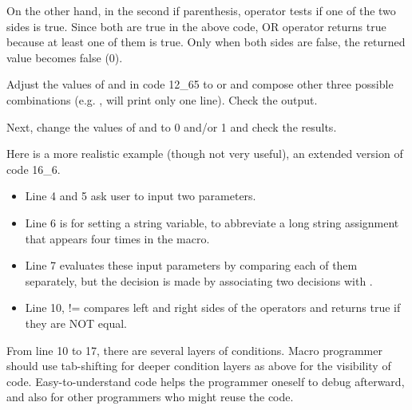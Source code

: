 On the other hand, in the second if parenthesis,
\ilcom{||} operator tests if one of the two sides is true. Since both are
true in the above code, OR operator returns true because at least one of them is
true. Only when both sides are false, the returned value becomes false (0).

\begin{indentexercise}{1}
Adjust the values of  and  in code 12\_65 to  or  and
compose other three possible combinations (e.g. ,  will print
only one line). Check the output.

Next, change the values of  and  to 0 and/or
1 and check the results. 
\end{indentexercise}

Here is a more realistic example (though not very useful), an extended version
of code 16\_6.

\begin{itemize}
\item Line 4 and 5 ask user to input two parameters.
\item Line 6 is for setting a string variable, to abbreviate a long string assignment that appears four times in the macro.
\item Line 7 evaluates these input parameters by comparing each of them separately, but the decision is made by associating two decisions with \ilcom{\&\&}. 
\item Line 10, != compares left and right sides of the operators and returns true if they are NOT equal.   
\end{itemize}
From line 10 to 17, there are several layers of conditions. Macro programmer should use tab-shifting for deeper condition layers as above for the visibility of code. Easy-to-understand code helps the programmer oneself to debug afterward, and also for other programmers who might reuse the code.
